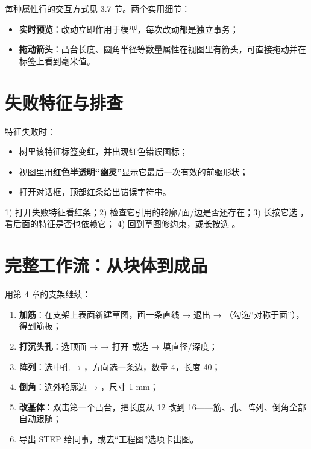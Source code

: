 每种属性行的交互方式见 3.7 节。两个实用细节：

\begin{itemize}
  \item \textbf{实时预览}：改动立即作用于模型，每次改动都是独立事务；
  \item \textbf{拖动箭头}：凸台长度、圆角半径等数量属性在视图里有箭头，可直接拖动并在标签上看到毫米值。
\end{itemize}

\section{失败特征与排查}

特征失败时：

\begin{itemize}
  \item 树里该特征标签变\textbf{红}，并出现红色错误图标；
  \item 视图里用\textbf{红色半透明“幽灵”}显示它最后一次有效的前驱形状；
  \item 打开对话框，顶部红条给出错误字符串。
\end{itemize}

\begin{practice}[排查四步法]
1) 打开失败特征看红条；2) 检查它引用的轮廓/面/边是否还存在；3) 长按它选 ，看后面的特征是否也依赖它；
4) 回到草图修约束，或长按选 。
\end{practice}

\section{完整工作流：从块体到成品}

用第 4 章的支架继续：

\begin{enumerate}
  \item \textbf{加筋}：在支架上表面新建草图，画一条直线 → 退出 → （勾选“对称于面”），得到筋板；
  \item \textbf{打沉头孔}：选顶面 →  → 打开  或选  → 填直径/深度；
  \item \textbf{阵列}：选中孔 → ，方向选一条边，数量 4，长度 40；
  \item \textbf{倒角}：选外轮廓边 → ，尺寸 1 mm；
  \item \textbf{改基体}：双击第一个凸台，把长度从 12 改到 16——筋、孔、阵列、倒角全部自动跟随；
  \item 导出 STEP 给同事，或去“工程图”选项卡出图。
\end{enumerate}

